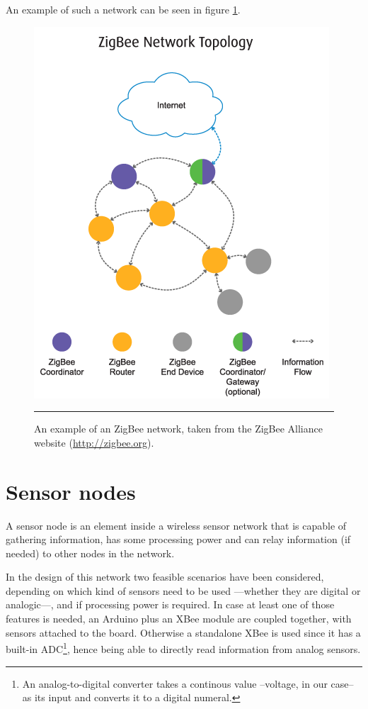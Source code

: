 An example of such a network can be seen in figure \ref{fig:ZBeeNet}.

\begin{figure}[htbp]
    \centering
        \includegraphics[scale=0.7]{./Figures/zigbee_topology.png}
        \rule{35em}{0.5pt}
        \caption[ZigBee network example]{An example of an ZigBee network, taken from the ZigBee Alliance website (\url{http://zigbee.org}).}
    \label{fig:ZBeeNet}
\end{figure}


\section{Sensor nodes}

A sensor node is an element inside a wireless sensor network that is capable of gathering information, has some processing power and can relay information (if needed) to other nodes in the network\cite{chong2003sensor}.

In the design of this network two feasible scenarios have been considered, depending on which kind of sensors need to be used ---whether they are digital or analogic---, and if processing power is required. In case at least one of those features is needed, an Arduino plus an XBee\textregistered{} module are coupled together, with sensors attached to the board. Otherwise a standalone XBee\textregistered{} is used since it has a built-in ADC\footnote{An analog-to-digital converter takes a continous value --voltage, in our case-- as its input and converts it to a digital numeral.}, hence being able to directly read information from analog sensors.

